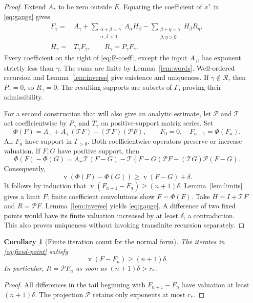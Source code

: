 \documentclass[11pt,a4paper]{article}
\numberwithin{equation}{section}
\newtheorem{corollary}[theorem]{Corollary}
\theoremstyle{definition}
\theoremstyle{remark}
\newcommand{\G}{\Gamma}
\newcommand{\Res}{\mathcal R}
\newcommand{\val}{\operatorname{v}}
\newcommand{\Aplus}{A_{+}}
\newcommand{\Ph}{\mathcal P}
\newcommand{\Th}{\mathcal T}
\begin{document}
\begin{proof}
Extend $A_\gamma$ to be zero outside $E$. Equating the coefficient of
$x^\gamma$ in \eqref{eq:gauge} gives
\begin{align}
 F_\gamma={}&A_\gamma+
   \sum_{\substack{\alpha+\beta=\gamma\\\alpha,\beta>0}}
          A_\alpha H_\beta
   -\sum_{\substack{\beta+\eta=\gamma\\\beta,\eta>0}}
          H_\beta R_\eta,                                      \label{eq:F-coeff}\\
 H_\gamma={}&T_\gamma F_\gamma,\qquad
 R_\gamma=P_\gamma F_\gamma.                                  \label{eq:recurrence}
\end{align}
Every coefficient on the right of \eqref{eq:F-coeff}, except the input
$A_\gamma$, has exponent strictly less than $\gamma$. The sums are
finite by Lemma~\ref{lem:words}. Well-ordered recursion and
Lemma~\ref{lem:inverse} give existence and uniqueness. If
$\gamma\notin\Res$, then $P_\gamma=0$, so $R_\gamma=0$. The resulting
supports are subsets of $\G$, proving their admissibility.

For a second construction that will also give an analytic estimate, let
$\Ph$ and $\Th$ act coefficientwise by $P_\gamma$ and $T_\gamma$ on
positive-support matrix series. Set
\begin{equation}\label{eq:fixed-point}
 \Phi(F)=\Aplus+\Aplus(\Th F)-(\Th F)(\Ph F),\qquad F_0=0,
 \quad F_{n+1}=\Phi(F_n).
\end{equation}
All $F_n$ have support in $\G_{>0}$. Both coefficientwise operators
preserve or increase valuation. If $F,G$ have positive support, then
\[
 \Phi(F)-\Phi(G)=\Aplus\Th(F-G)
  -\Th(F-G)\Ph F-(\Th G)\Ph(F-G).
\]
Consequently,
\begin{equation}\label{eq:valuation-contraction}
 \val(\Phi(F)-\Phi(G))\geq\val(F-G)+\delta.
\end{equation}
It follows by induction that
$\val(F_{n+1}-F_n)\geq(n+1)\delta$. Lemma~\ref{lem:limits} gives a
limit $F$; finite coefficient convolutions show $F=\Phi(F)$. Take
$H=I+\Th F$ and $R=\Ph F$. Lemma~\ref{lem:inverse} yields
\eqref{eq:gauge}. A difference of two fixed points would have its finite
valuation increased by at least $\delta$, a contradiction. This also
proves uniqueness without invoking transfinite recursion separately.
\end{proof}

\begin{corollary}[Finite iteration count for the normal form]
\label{cor:iterations}
The iterates in \eqref{eq:fixed-point} satisfy
\[
 \val(F-F_n)\geq(n+1)\delta.
\]
In particular, $R=\Ph F_n$ as soon as $(n+1)\delta>r_*$.
\end{corollary}
\begin{proof}
All differences in the tail beginning with $F_{n+1}-F_n$ have valuation
at least $(n+1)\delta$. The projection $\Ph$ retains only exponents at
most $r_*$.
\end{proof}
\end{document}

